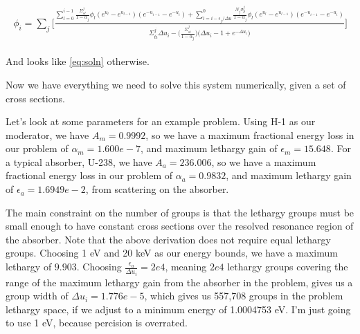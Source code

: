 \documentclass{article}
\begin{document}
        \begin{align}
        \begin{split}
            \label{eq:soln}
            \phi_i =
                \sum_j \bigg[
            \frac{
                \sum_{l = 0}^{i-1} \frac{ \Sigma_{sl}^j }{1-\alpha_j}  \phi_l  
                (e^{u_l} - e^{u_{l-1}})   (e^{-u_{i-1}} - e^{-u_{i}}) 
                +
                \sum_{l = i-\epsilon_j/\Delta u}^{0} \frac{N_j  \sigma_{p}^j }{1-\alpha_j}  \phi_l  
                (e^{u_l} - e^{u_{l-1}})   (e^{-u_{i-1}} - e^{-u_{i}}) 
            }
            {  
                \Sigma_{ti}^j  \Delta u_i  - 
                \big( \frac{ \Sigma_{si}^j }{1-\alpha_j}  \big)
            \big( \Delta u_i -1 + e^{-\Delta u_i} \big)  
             }
         \bigg]
        \end{split}
        \end{align}

        And looks like \ref{eq:soln} otherwise.

        Now we have everything we need to solve this system numerically, given a set of cross sections.

        Let's look at some parameters for an example problem.
        Using H-1 as our moderator, we have 
        $A_m = 0.9992$, so we have a
        maximum fractional energy loss in our problem of $\alpha_m = 1.600e-7$, and 
        maximum lethargy gain of $\epsilon_m = 15.648$. 
        For a typical absorber, U-238, we have 
        $A_a = 236.006$, so we have a
        maximum fractional energy loss in our problem of $\alpha_a = 0.9832$, and 
        maximum lethargy gain of $\epsilon_a = 1.6949e-2$, from scattering on the absorber. 
        
        
        The main constraint on the number of groups is that the lethargy groups must be small
        enough to have constant cross sections over the resolved resonance region of the absorber.
        Note that the above derivation does not require equal lethargy groups.
        Choosing 1 eV and 20 keV as our energy bounds, we have a maximum lethargy of $9.903$.
        Choosing $\frac{\epsilon_a}{\Delta u_i} = 2e4$, meaning $2e4$ lethargy groups 
        covering the range of the maximum lethargy gain from the absorber in the problem, 
        gives us a group width of $\Delta u_i = 1.776e-5$,
        which gives us 557,708 groups in the problem lethargy space, if we adjust to a 
        minimum energy of 1.0004753 eV. 
        I'm just going to use 1 eV, because percision is overrated.
    
\end{document}
